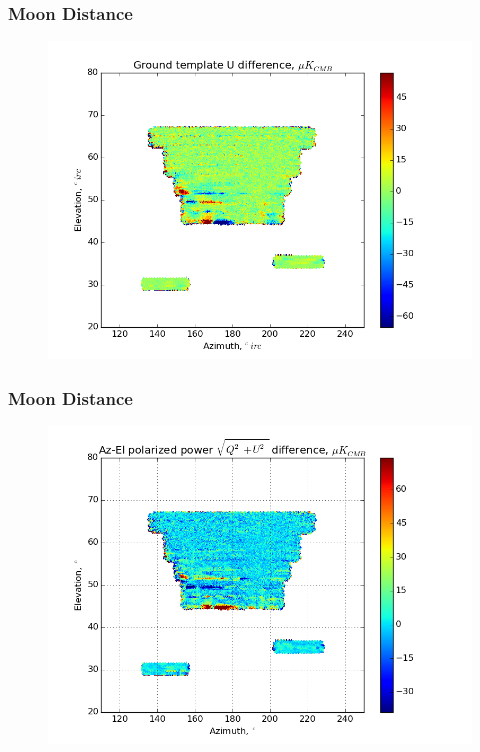 \documentclass{beamer}
\begin{document}
\begin{frame}
\frametitle{Moon Distance}
\begin{figure}
\includegraphics[width=0.9\linewidth]{dU_gt_MOON_DIST.png}
\end{figure}
\end{frame}

\begin{frame}
\frametitle{Moon Distance}
\begin{figure}
\includegraphics[width=0.9\linewidth]{dMag_gt_MOON_DIST.png}
\end{figure}
\end{frame}
\end{document}
